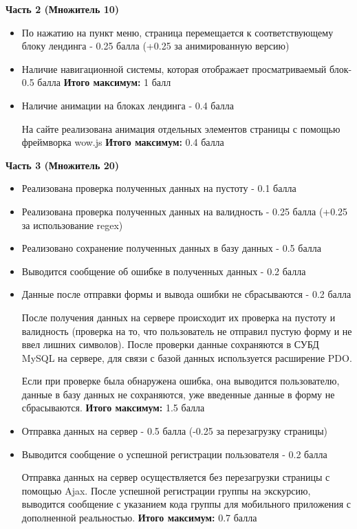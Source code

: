 \textbf{Часть 2 (Множитель 10)}
\begin{itemize}
    \item По нажатию на пункт меню, страница перемещается к соответствующему блоку лендинга  - 0.25 балла (+0.25 за анимированную версию)
    \item Наличие навигационной системы, которая отображает просматриваемый блок- 0.5 балла
    \textbf{Итого максимум:} 1 балл

    \item Наличие анимации на блоках лендинга - 0.4 балла

    На сайте реализована анимация отдельных элементов страницы с помощью фреймворка wow.js
    \textbf{Итого максимум:} 0.4 балла
\end{itemize}

\textbf{Часть 3 (Множитель 20)}

\begin{itemize}
    \item Реализована проверка полученных данных на пустоту - 0.1 балла
    \item Реализована проверка полученных данных на валидность - 0.25 балла (+0.25 за использование regex)
    \item Реализовано сохранение полученных данных в базу данных - 0.5 балла
    \item Выводится сообщение об ошибке в полученных данных - 0.2 балла
    \item Данные после отправки формы и вывода ошибки не сбрасываются - 0.2 балла
    
    После получения данных на сервере происходит их проверка на пустоту и валидность (проверка на то, что пользователь не отправил пустую форму и не ввел лишних символов). После проверки данные сохраняются в СУБД MySQL на сервере, для связи с базой данных используется расширение PDO. 

    Если при проверке была обнаружена ошибка, она выводится пользователю, данные в базу данных не сохраняются, уже введенные данные в форму не сбрасываются.
    \textbf{Итого максимум:} 1.5 балла
    
    \item Отправка данных на сервер - 0.5 балла (-0.25 за перезагрузку страницы)
    \item Выводится сообщение о успешной регистрации пользователя - 0.2 балла
    
    Отправка данных на сервер осуществляется без перезагрузки страницы с помощью Ajax. После успешной регистрации группы на экскурсию, выводится сообщение с указанием кода группы для мобильного приложения с дополненной реальностью.
    \textbf{Итого максимум:} 0.7 балла
\end{itemize}

